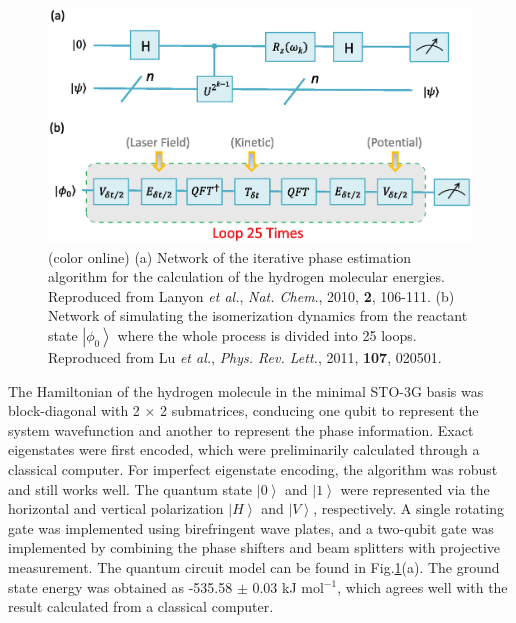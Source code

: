 \documentclass[8.5pt,twoside,twocolumn]{article}
\begin{document}
\begin{figure}[htb]
\begin{center}
\includegraphics[width= 0.95\columnwidth]{fig2.eps}
\end{center}
\caption{(color online) (a) Network of the iterative phase estimation algorithm
for the calculation of the hydrogen molecular energies. Reproduced from Lanyon  \emph{et al.}, \emph{Nat. Chem}., 2010, \textbf{2}, 106-111.\cite{Optics_static}
(b) Network of simulating the isomerization dynamics from
the reactant state $\left\vert \phi_{0} \right\rangle$ where
the whole process is divided into 25 loops. Reproduced from Lu  \emph{et al.}, \emph{Phys. Rev. Lett.}, 2011, \textbf{107}, 020501.\cite{NMR_dynamic}}\label{fig2}
\end{figure}

The Hamiltonian of the hydrogen molecule in the minimal STO-3G basis
was block-diagonal with 2 $\times$ 2 submatrices,
conducing one qubit to represent the system wavefunction
and another to represent the phase information.
Exact eigenstates were first encoded,
which were preliminarily calculated through a classical computer.
For imperfect eigenstate encoding,
the algorithm was robust and still works well.
The quantum state $\left\vert 0 \right\rangle$ and
$\left\vert 1 \right\rangle$ were represented via
the horizontal and vertical polarization
$\left\vert H \right\rangle$ and $\left\vert V \right\rangle$,
respectively.
A single rotating gate was implemented using birefringent wave plates,
and a two-qubit gate was implemented by combining the phase shifters
and beam splitters with projective measurement.
The quantum circuit model can be found in Fig.\ref{fig2}(a).
The ground state energy was obtained as -535.58 $\pm$ 0.03 kJ mol$^{-1}$,
which agrees well with the result calculated
from a classical computer.
\end{document}
